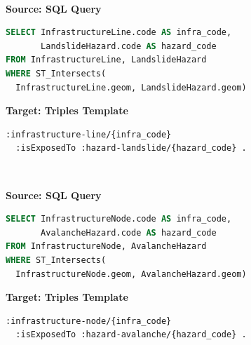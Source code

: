 \begin{figure}[ht!]
  \vspace*{-1mm}
  \textbf{\small{}} \\
  \begin{minipage}[t]{0.50\textwidth}
    \centering
    \textbf{\scriptsize Source: SQL Query}
\begin{lstlisting}[language=SQL]
SELECT InfrastructureLine.code AS infra_code,
       LandslideHazard.code AS hazard_code
FROM InfrastructureLine, LandslideHazard
WHERE ST_Intersects(
  InfrastructureLine.geom, LandslideHazard.geom)
\end{lstlisting}
  \end{minipage}
  \hfill
  \begin{minipage}[t]{0.50\textwidth}
    \centering
    \textbf{\scriptsize Target: Triples Template}
\begin{lstlisting}[language=Turtle]
:infrastructure-line/{infra_code}
  :isExposedTo :hazard-landslide/{hazard_code} . 
\end{lstlisting}
  \end{minipage}
  \vspace*{-4mm}
\end{figure}

\begin{figure}[ht!]
  \vspace*{-1mm}
  \textbf{\small{}} \\
  \begin{minipage}[t]{0.50\textwidth}
    \centering
    \textbf{\scriptsize Source: SQL Query}
\begin{lstlisting}[language=SQL]
SELECT InfrastructureNode.code AS infra_code,
       AvalancheHazard.code AS hazard_code
FROM InfrastructureNode, AvalancheHazard
WHERE ST_Intersects(
  InfrastructureNode.geom, AvalancheHazard.geom)
\end{lstlisting}
  \end{minipage}
  \hfill
  \begin{minipage}[t]{0.50\textwidth}
    \centering
    \textbf{\scriptsize Target: Triples Template}
\begin{lstlisting}[language=Turtle]
:infrastructure-node/{infra_code}
  :isExposedTo :hazard-avalanche/{hazard_code} . 
\end{lstlisting}
  \end{minipage}
  \vspace*{-4mm}
\end{figure}

